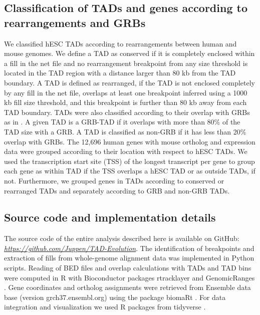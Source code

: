\documentclass[a4paper,twoside=true,openright,parskip=full,chapterprefix=true,11pt,headings=normal,bibliography=totoc,listof=totoc,titlepage=on,captions=tableabove,draft=false]{scrreprt}
\theoremstyle{definition}
\theoremstyle{definition}
\theoremstyle{definition}
\theoremstyle{remark}
\begin{document}
\subsection{Classification of TADs and genes according to rearrangements
and
GRBs}\label{classification-of-tads-and-genes-according-to-rearrangements-and-grbs}

We classified hESC TADs according to rearrangements between human and
mouse genomes. We define a TAD as conserved if it is completely enclosed
within a fill in the net file and no rearrangement breakpoint from any
size threshold is located in the TAD region with a distance larger than
80 kb from the TAD boundary. A TAD is defined as rearranged, if the TAD
is not enclosed completely by any fill in the net file, overlaps at
least one breakpoint inferred using a 1000 kb fill size threshold, and
this breakpoint is further than 80 kb away from each TAD boundary. TADs
were also classified according to their overlap with GRBs as in
\citep{Harmston2017}. A given TAD is a GRB-TAD if it overlaps with more
than 80\% of the TAD size with a GRB. A TAD is classified as non-GRB if
it has less than 20\% overlap with GRBs. The 12,696 human genes with
mouse ortholog and expression data were grouped according to their
location with respect to hESC TADs. We used the transcription start site
(TSS) of the longest transcript per gene to group each gene as within
TAD if the TSS overlaps a hESC TAD or as outside TADs, if not.
Furthermore, we grouped genes in TADs according to conserved or
rearranged TADs and separately according to GRB and non-GRB TADs.

\subsection{Source code and implementation
details}\label{source-code-and-implementation-details}

The source code of the entire analysis described here is available on
GitHub:
\href{https://github.com/Juppen/TAD-Evolution}{\emph{https://github.com/Juppen/TAD-Evolution}}.
The identification of breakpoints and extraction of fills from
whole-genome alignment data was implemented in Python scripts. Reading
of BED files and overlap calculations with TADs and TAD bins were
computed in R with Bioconductor \citep{Huber2015} packages rtracklayer
\citep{Lawrence2009} and GenomicRanges \citep{Lawrence2013}. Gene
coordinates and ortholog assignments were retrieved from Ensemble data
base (version grch37.ensembl.org) using the package biomaRt
\citep{Durinck2009}. For data integration and visualization we used R
packages from tidyverse \citep{Wickham2017}.
\end{document}

